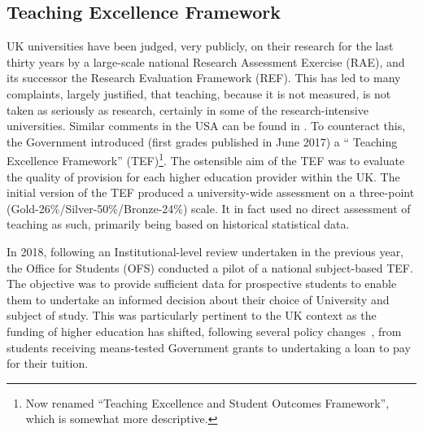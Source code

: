 \documentclass[sigconf,anonymous]{acmart}
\begin{document}
\subsection{Teaching Excellence Framework}

UK universities have been judged, very publicly, on their research for
the last thirty years by a large-scale national Research Assessment
Exercise (RAE), and its successor the Research Evaluation Framework
(REF). This has led to many complaints, largely justified, that
teaching, because it is not measured, is not taken as seriously as
research, certainly in some of the research-intensive
universities. Similar comments in the USA can be found in
\cite{Campbelletal2018a}. To counteract this, the Government
introduced (first grades published in June 2017) a `` Teaching
Excellence Framework'' (TEF)\footnote{Now renamed ``Teaching
Excellence and Student Outcomes Framework'', which is somewhat more
descriptive.}. The ostensible aim of the TEF was to evaluate the
quality of provision for each higher education provider within the
UK. The initial version of the TEF produced a
university-wide assessment on a three-point
(Gold-26\%/Silver-50\%/Bronze-24\%) scale. It in fact used no
direct assessment of teaching as such, primarily being based on
historical statistical data.

In 2018, following an Institutional-level review undertaken in the
previous year, the Office for Students (OFS) conducted a pilot of a
national subject-based TEF. The objective was to provide sufficient
data for prospective students to enable them to undertake an informed
decision about their choice of University and subject of study. This
was particularly pertinent to the UK context as the funding of higher
education has shifted, following several policy
changes~\cite{BIS2010a}, from students receiving means-tested
Government grants to undertaking a loan to pay for their tuition.
\end{document}
